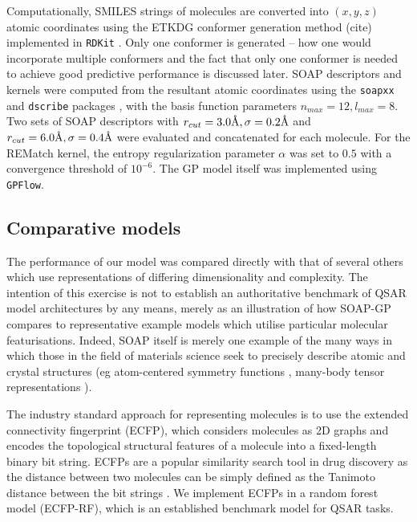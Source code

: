 Computationally, SMILES strings of molecules are converted into $(x,y,z)$ atomic coordinates using the ETKDG conformer generation method (cite) implemented in \texttt{RDKit} \cite{rdkit}. Only one conformer is generated -- how one would incorporate multiple conformers and the fact that only one conformer is needed to achieve good predictive performance is discussed later. SOAP descriptors and kernels were computed from the resultant atomic coordinates using the \texttt{soapxx} and \texttt{dscribe} packages \cite{soapxx,dscribe}, with the basis function parameters $ n_{max}=12, l_{max}=8$. Two sets of SOAP descriptors with $r_{cut}=3.0\textup{\AA}, \sigma=0.2\textup{\AA}$ and $r_{cut}=6.0\textup{\AA}, \sigma=0.4\textup{\AA}$ were evaluated and concatenated for each molecule. For the REMatch kernel, the entropy regularization parameter $\alpha$ was set to $0.5$ with a convergence threshold of $10^{-6}$. The GP model itself was implemented using \texttt{GPFlow}.


\subsection{Comparative models}
The performance of our model was compared directly with that of several others which use representations of differing dimensionality and complexity. The intention of this exercise is not to establish an authoritative benchmark of QSAR model architectures by any means, merely as an illustration of how SOAP-GP compares to representative example models which utilise particular molecular featurisations. Indeed, SOAP itself is merely one example of the many ways in which those in the field of materials science seek to precisely describe atomic and crystal structures (eg atom-centered symmetry functions \cite{Behler2011, Faber2018}, many-body tensor representations \cite{huo2017unified}).

The industry standard approach for representing molecules is to use the extended connectivity fingerprint (ECFP), which considers molecules as 2D graphs and encodes the topological structural features of a molecule into a fixed-length binary bit string. ECFPs are a popular similarity search tool in drug discovery as the distance between two molecules can be simply defined as the Tanimoto distance between the bit strings \cite{Todeschini2012tanimoto}. We implement ECFPs in a random forest model (ECFP-RF), which is an established benchmark model for QSAR tasks.

